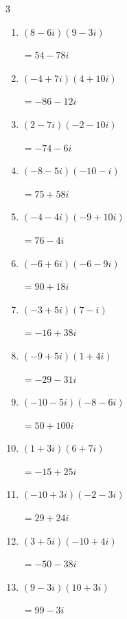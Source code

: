 \begin{multicols}{3}
\begin{enumerate}
        $\displaystyle =-15+36i$

  \item $\displaystyle (8-6i)(9-3i)$

        $\displaystyle =54-78i$

  \item $\displaystyle (-4+7i)(4+10i)$

        $\displaystyle =-86-12i$

  \item $\displaystyle (2-7i)(-2-10i)$

        $\displaystyle =-74-6i$

  \item $\displaystyle (-8-5i)(-10-i)$

        $\displaystyle =75+58i$

  \item $\displaystyle (-4-4i)(-9+10i)$

        $\displaystyle =76-4i$

\columnbreak %

  \item $\displaystyle (-6+6i)(-6-9i)$

        $\displaystyle =90+18i$

  \item $\displaystyle (-3+5i)(7-i)$

        $\displaystyle =-16+38i$

  \item $\displaystyle (-9+5i)(1+4i)$

        $\displaystyle =-29-31i$

  \item $\displaystyle (-10-5i)(-8-6i)$

        $\displaystyle =50+100i$

  \item $\displaystyle (1+3i)(6+7i)$

        $\displaystyle =-15+25i$

  \item $\displaystyle (-10+3i)(-2-3i)$

        $\displaystyle =29+24i$

  \item $\displaystyle (3+5i)(-10+4i)$

        $\displaystyle =-50-38i$

  \item $\displaystyle (9-3i)(10+3i)$

        $\displaystyle =99-3i$


\end{enumerate}
\end{multicols}
